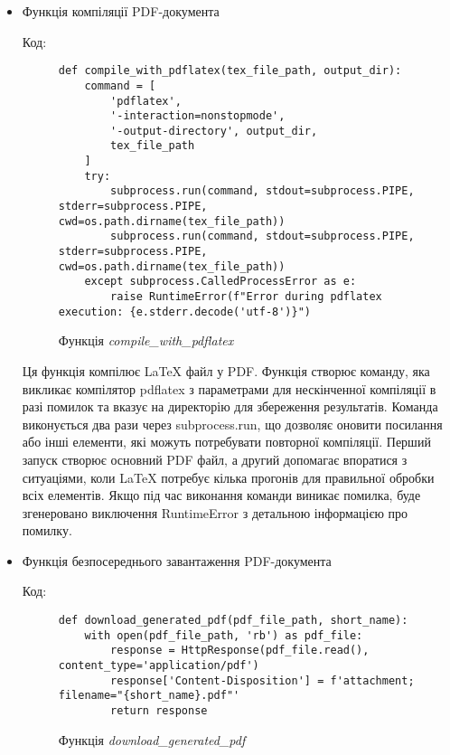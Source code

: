 \documentclass[a4paper,14pt]{extarticle}
\numberwithin{figure}{section}
\begin{document}
\begin{itemize}
    \newpage

    \item Функція компіляції PDF-документа

    Код:
    \begin{figure}[h]
    \centering
    \begin{lstlisting}[style=mystyle]
    def compile_with_pdflatex(tex_file_path, output_dir):
    command = [
        'pdflatex',
        '-interaction=nonstopmode',
        '-output-directory', output_dir,
        tex_file_path
    ]
    try:
        subprocess.run(command, stdout=subprocess.PIPE, stderr=subprocess.PIPE, cwd=os.path.dirname(tex_file_path))
        subprocess.run(command, stdout=subprocess.PIPE, stderr=subprocess.PIPE, cwd=os.path.dirname(tex_file_path))
    except subprocess.CalledProcessError as e:
        raise RuntimeError(f"Error during pdflatex execution: {e.stderr.decode('utf-8')}")
    \end{lstlisting}
    \caption{\normalsize Функція \textit{compile\_with\_pdflatex}}
    \end{figure}

    Ця функція компілює LaTeX файл у PDF. Функція створює команду, яка викликає компілятор pdflatex з параметрами для нескінченної компіляції в разі помилок та вказує на директорію для збереження результатів. Команда виконується два рази через subprocess.run, що дозволяє оновити посилання або інші елементи, які можуть потребувати повторної компіляції. Перший запуск створює основний PDF файл, а другий допомагає впоратися з ситуаціями, коли LaTeX потребує кілька прогонів для правильної обробки всіх елементів. Якщо під час виконання команди виникає помилка, буде згенеровано виключення RuntimeError з детальною інформацією про помилку.

        \newpage

    \item Функція безпосереднього завантаження PDF-документа

    Код:
    \begin{figure}[h]
    \centering
    \begin{lstlisting}[style=mystyle]
    def download_generated_pdf(pdf_file_path, short_name):
    with open(pdf_file_path, 'rb') as pdf_file:
        response = HttpResponse(pdf_file.read(), content_type='application/pdf')
        response['Content-Disposition'] = f'attachment; filename="{short_name}.pdf"'
        return response
    \end{lstlisting}
    \caption{\normalsize Функція \textit{download\_generated\_pdf}}
    \end{figure}


\end{itemize}
\end{document}
